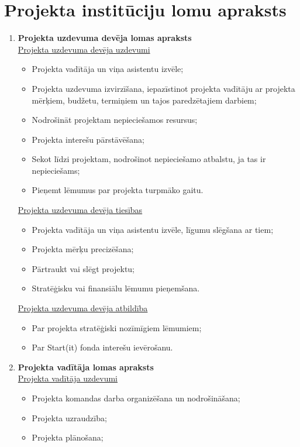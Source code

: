 \section{Projekta institūciju lomu apraksts}
\begin{enumerate}
  \item \textbf{Projekta uzdevuma devēja lomas apraksts} \\
    \underline{Projekta uzdevuma devēja uzdevumi}
    \begin{itemize}
      \item Projekta vadītāja un viņa asistentu izvēle;
      \item Projekta uzdevuma izvirzīšana, iepazīstinot projekta vadītāju ar projekta mērķiem, budžetu,
      termiņiem un tajos paredzētajiem darbiem;
      \item Nodrošināt projektam nepieciešamos resursus;
      \item Projekta interešu pārstāvēšana;
      \item Sekot līdzi projektam, nodrošinot nepieciešamo atbalstu, ja tas ir nepieciešams;
      \item Pieņemt lēmumus par projekta turpmāko gaitu. 
    \end{itemize}
    \underline{Projekta uzdevuma devēja tiesības}
    \begin{itemize}
      \item Projekta vadītāja un viņa asistentu izvēle, līgumu slēgšana ar tiem;
      \item Projekta mērķu precizēšana;
      \item Pārtraukt vai slēgt projektu;
      \item Stratēģisku vai finansiālu lēmumu pieņemšana.
    \end{itemize}
    \underline{Projekta uzdevuma devēja atbildība}
    \begin{itemize}
      \item Par projekta stratēģiski nozīmīgiem lēmumiem;
      \item Par Start(it) fonda interešu ievērošanu. 
    \end{itemize}
  \item \textbf{Projekta vadītāja lomas apraksts} \\
    \underline{Projekta vadītāja uzdevumi}
    \begin{itemize}
      \item Projekta komandas darba organizēšana un nodrošināšana;
      \item Projekta uzraudzība;
      \item Projekta plānošana;

\end{itemize}
\end{enumerate}

